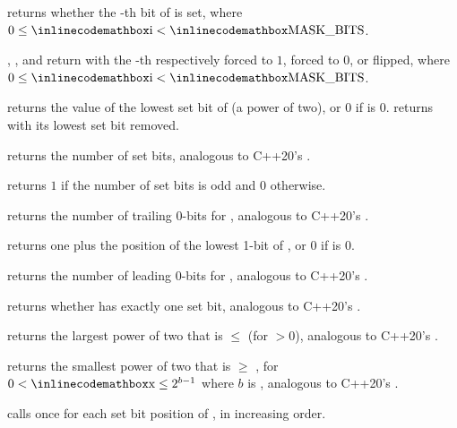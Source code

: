 \begin{compactitem}
  \item {} returns whether the -th bit of  is set, where $0 \leq {\inlinecodemath{i}} < {\inlinecodemath{MASK\_BITS}}$.
  \item {}, , and  return  with the -th respectively forced to $1$, forced to $0$, or flipped, where $0 \leq {\inlinecodemath{i}} < {\inlinecodemath{MASK\_BITS}}$.
  \item {} returns the value of the lowest set bit of  (a power of two), or $0$ if  is $0$.  returns  with its lowest set bit removed.
  \item {} returns the number of set bits, analogous to C++20's .
  \item {} returns $1$ if the number of set bits is odd and $0$ otherwise.
  \item {} returns the number of trailing 0-bits for , analogous to C++20's .
  \item {} returns one plus the position of the lowest 1-bit of , or $0$ if  is $0$.
  \item {} returns the number of leading 0-bits for , analogous to C++20's .
  \item {} returns whether  has exactly one set bit, analogous to C++20's .
  \item {} returns the largest power of two that is $\leq$  (for  $> 0$), analogous to C++20's .
  \item {} returns the smallest power of two that is $\geq$ , for $0 < {\inlinecodemath{x}} \leq 2^{b - 1}$ where $b$ is , analogous to C++20's .
  \item {} calls  once for each set bit position  of , in increasing order.
\end{compactitem}

